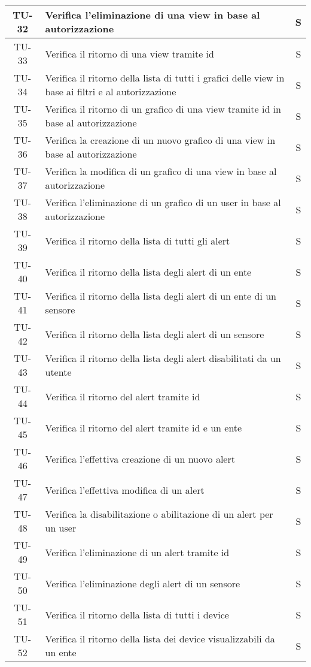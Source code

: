 \begin{center}
\begin{longtable}{|c|p{12cm}|c|}
			\hline
			TU-32 & Verifica l'eliminazione di una view in base al autorizzazione & S \\
			\hline
			TU-33 & Verifica il ritorno di una view tramite id & S \\
			\hline
			TU-34 & Verifica il ritorno della lista di tutti i grafici delle view in base ai filtri e al autorizzazione & S \\
			\hline
			TU-35 & Verifica il ritorno di un grafico di una view tramite id in base al autorizzazione & S \\
			\hline
			TU-36 & Verifica la creazione di un nuovo grafico di una view in base al autorizzazione & S \\
			\hline
			TU-37 & Verifica la modifica di un grafico di una view in base al autorizzazione & S \\
			\hline
			TU-38 & Verifica l'eliminazione di un grafico di un user in base al autorizzazione & S \\
			\hline
			TU-39 & Verifica il ritorno della lista di tutti gli alert & S \\
			\hline
			TU-40 & Verifica il ritorno della lista degli alert di un ente & S \\
			\hline
			TU-41 & Verifica il ritorno della lista degli alert di un ente di un sensore & S \\
			\hline
			TU-42 & Verifica il ritorno della lista degli alert di un sensore & S \\
			\hline
			TU-43 & Verifica il ritorno della lista degli alert disabilitati da un utente & S \\
			\hline
			TU-44 & Verifica il ritorno del alert tramite id & S \\
			\hline
			TU-45 & Verifica il ritorno del alert tramite id e un ente & S \\
			\hline
			TU-46 & Verifica l'effettiva creazione di un nuovo alert & S \\
			\hline
			TU-47 & Verifica l'effettiva modifica di un alert & S \\
			\hline
			TU-48 & Verifica la disabilitazione o abilitazione di un alert per un user & S \\
			\hline
			TU-49 & Verifica l'eliminazione di un alert tramite id & S \\
			\hline
			TU-50 & Verifica l'eliminazione degli alert di un sensore & S \\
			\hline
			TU-51 & Verifica il ritorno della lista di tutti i device & S \\
			\hline
			TU-52 & Verifica il ritorno della lista dei device visualizzabili da un ente & S \\

\end{longtable}
\end{center}
